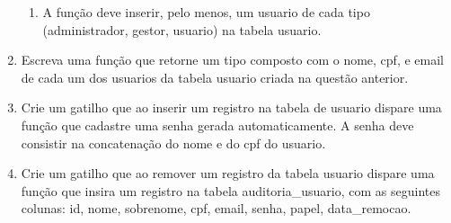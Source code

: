 \documentclass[12pt]{article}
\begin{document}
\begin{enumerate}
\begin{enumerate}
\item A função deve inserir, pelo menos, um usuario de cada tipo (administrador, gestor, usuario) na tabela usuario.

\end{enumerate}

\item Escreva uma função que retorne um tipo composto com o nome, cpf, e email de cada um dos usuarios da tabela usuario criada na questão anterior.

\item Crie um gatilho que ao inserir um registro na tabela de usuario dispare uma função que cadastre uma senha gerada automaticamente. A senha deve consistir na concatenação do nome e do cpf do usuario.

\item Crie um gatilho que ao remover um registro da tabela usuario dispare uma função que insira um registro na tabela auditoria\_usuario, com as seguintes colunas: id, nome, sobrenome, cpf, email, senha, papel, data\_remocao.

\end{enumerate}
\end{document}
